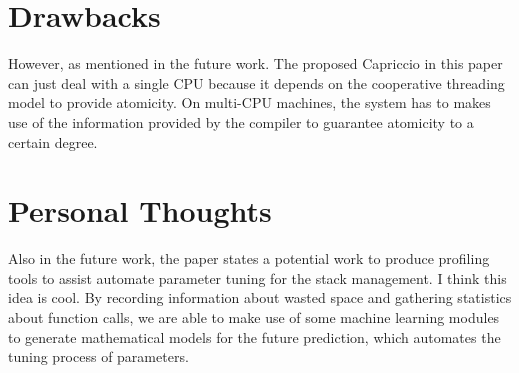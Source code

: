 \documentclass[10pt, letterpaper]{article}
\begin{document}
\section{Drawbacks}
\label{sec-drawbacks}
However, as mentioned in the future work. The proposed Capriccio in this paper can just deal with a single CPU because it depends on the cooperative threading model to provide atomicity. On multi-CPU machines, the system has to makes use of the information provided by the compiler to guarantee atomicity to a certain degree.

\section{Personal Thoughts}
\label{sec-thoughts}
Also in the future work, the paper states a potential work to produce profiling tools to assist automate parameter tuning for the stack management. I think this idea is cool. By recording information about wasted space and gathering statistics about function calls, we are able to make use of some machine learning modules to generate mathematical models for the future prediction, which automates the tuning process of parameters.



\end{document}

